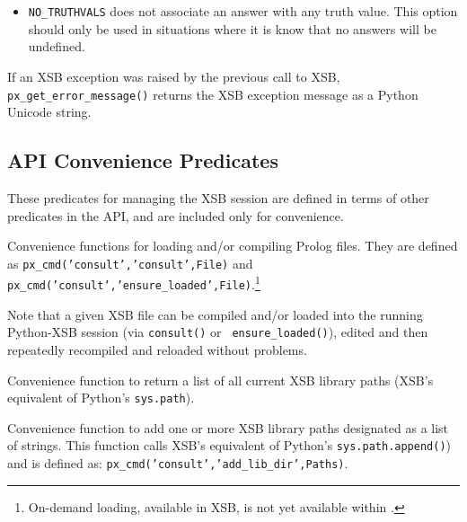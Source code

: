 \begin{description}
\begin{itemize}
      \item {\tt NO\_TRUTHVALS} does not associate an answer with any
        truth value.  This option should only be used in situations
        where it is know that no answers will be undefined.
        \ei
  \end{itemize}

  If an XSB exception was raised by the previous call to XSB, {\tt
    px\_get\_error\_message()} returns the XSB exception message as a
  Python Unicode string.
  
  
\end{description}

\subsection{\px{} API Convenience Predicates}

These predicates for managing the XSB session are defined in terms of
other predicates in the \px{} API, and are included only for
convenience.

\begin{description}

%
  Convenience functions for loading and/or compiling Prolog files.
  They are defined as {\tt px\_cmd('consult','consult',File)} and {\tt
    px\_cmd('consult','ensure\_loaded',File)}.\footnote{On-demand
    loading, available in XSB, is not yet available within \px{}.}

  Note that a given XSB file can be compiled and/or loaded into the
  running Python-XSB session (via {\tt consult()} or {\tt
    ensure\_loaded()}), edited and then repeatedly recompiled and
    reloaded without problems.

%  
  Convenience function to return a list of all current XSB library
  paths (XSB's equivalent of Python's {\tt sys.path}).

%  
    Convenience function to add one or more XSB library paths
    designated as a list of strings.  This function calls XSB's
    equivalent of Python's {\tt sys.path.append()}) and is defined as:
    {\tt px\_cmd('consult','add\_lib\_dir',Paths)}.
  
\end{description}


